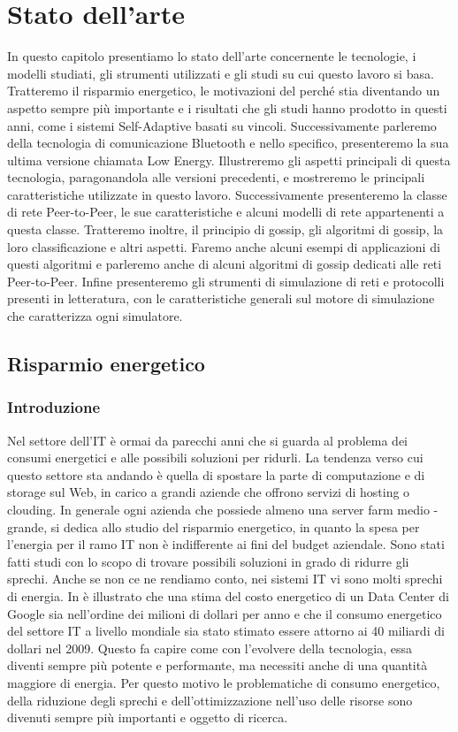 \chapter{Stato dell'arte}
\label{chap:Stato dell'arte}

In questo capitolo presentiamo lo stato dell'arte concernente le tecnologie, i modelli studiati, gli strumenti utilizzati e gli studi su cui questo lavoro si basa. Tratteremo il risparmio energetico, le motivazioni del perché stia diventando un aspetto sempre più importante e i risultati che gli studi hanno prodotto in questi anni, come i sistemi Self-Adaptive basati su vincoli. Successivamente parleremo della tecnologia di comunicazione Bluetooth e nello specifico, presenteremo la sua ultima versione chiamata Low Energy. Illustreremo gli aspetti principali di questa tecnologia, paragonandola alle versioni precedenti, e mostreremo le principali caratteristiche utilizzate in questo lavoro. Successivamente presenteremo la classe di rete Peer-to-Peer, le sue caratteristiche e alcuni modelli di rete appartenenti a questa classe. Tratteremo inoltre, il principio di gossip, gli algoritmi di gossip, la loro classificazione e altri aspetti. Faremo anche alcuni esempi di applicazioni di questi algoritmi e parleremo anche di alcuni algoritmi di gossip dedicati alle reti Peer-to-Peer. Infine presenteremo gli strumenti di simulazione di reti e protocolli presenti in letteratura, con le caratteristiche generali sul motore di simulazione che caratterizza ogni simulatore.

\section{Risparmio energetico}
\subsection{Introduzione}
Nel settore dell'\acf{IT} è ormai da parecchi anni che si guarda al problema dei consumi energetici e alle possibili soluzioni per ridurli. La tendenza verso cui questo settore sta andando è quella di spostare la parte di computazione e di storage sul Web, in carico a grandi aziende che offrono servizi di hosting o clouding. In generale ogni azienda che possiede almeno una server farm medio - grande, si dedica allo studio del risparmio energetico, in quanto la spesa per l'energia per il ramo \acs{IT} non è indifferente ai fini del budget aziendale. Sono stati fatti studi con lo scopo di trovare possibili soluzioni in grado di ridurre gli sprechi. Anche se non ce ne rendiamo conto, nei sistemi \acs{IT} vi sono molti sprechi di energia. In \cite{ranganathan2010-pac} è illustrato che una stima del costo energetico di un Data Center di Google sia nell'ordine dei milioni di dollari per anno e che il consumo energetico del settore \acs{IT} a livello mondiale sia stato stimato essere attorno ai 40 miliardi di dollari nel 2009. Questo fa capire come con l'evolvere della tecnologia, essa diventi sempre più potente e performante, ma necessiti anche di una quantità maggiore di energia. Per questo motivo le problematiche di consumo energetico, della riduzione degli sprechi e dell'ottimizzazione nell'uso delle risorse sono divenuti sempre più importanti e oggetto di ricerca.

